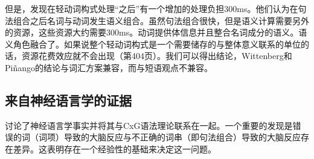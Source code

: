 \begin{exe}
\begin{xlist}[iv.]
\begin{exe}
\begin{xlist}[iv.]
但是，\citet{WP2011a}发现在轻动词构式处理“之后”有一个增加的处理负担300ms。他们认为在句法组合之后名词与动词发生语义组合。虽然句法组合很快，但是语义计算需要另外的资源，这些资源大约需要300ms。动词提供体信息并且整合名词成分的语义。语义角色融合了。如果说整个轻动词构式是一个需要储存的与整体意义联系的单位的话，资源花费效应就不会出现（第404页）。我们可以得出结论，Wittenberg和Piñango的结论与词汇方案兼容，而与短语观点不兼容。

\subsection{来自神经语言学的证据}
\label{sec-neuro-linguistics}

\mbox{}\citet*{PCShandbookCxG}讨论了神经语言学事实并将其与CxG语法理论联系在一起。一个重要的发现是错误的词（词项）导致的大脑反应与不正确的词串（即句法组合）导致的大脑反应存在差异。这表明存在一个经验性的基础来决定这一问题。


\end{xlist}
\end{exe}
\end{xlist}
\end{exe}
